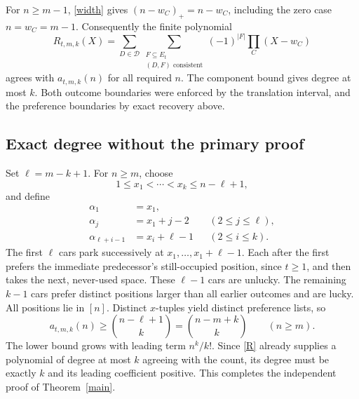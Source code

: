 \documentclass[11pt]{article}
\theoremstyle{definition}
\newcommand{\D}{\mathcal D}
\begin{document}
For $n\ge m-1$, \eqref{width} gives $(n-w_C)_+=n-w_C$, including the zero case $n=w_C=m-1$. Consequently the finite polynomial
\begin{equation}\label{R}
 R_{t,m,k}(X)=\sum_{D\in\D}
 \sum_{\substack{F\subseteq E_t\\(D,F)\text{ consistent}}}
 (-1)^{|F|}\prod_C(X-w_C)
\end{equation}
agrees with $a_{t,m,k}(n)$ for all required $n$. The component bound gives degree at most $k$. Both outcome boundaries were enforced by the translation interval, and the preference boundaries by exact recovery above.

\subsection{Exact degree without the primary proof}
Set $\ell=m-k+1$. For $n\ge m$, choose
\[
 1\le x_1<\cdots<x_k\le n-\ell+1,
\]
and define
\begin{align*}
 \alpha_1&=x_1,\\
 \alpha_j&=x_1+j-2 &&(2\le j\le\ell),\\
 \alpha_{\ell+i-1}&=x_i+\ell-1 &&(2\le i\le k).
\end{align*}
The first $\ell$ cars park successively at $x_1,\ldots,x_1+\ell-1$. Each after the first prefers the immediate predecessor's still-occupied position, since $t\ge1$, and then takes the next, never-used space. These $\ell-1$ cars are unlucky. The remaining $k-1$ cars prefer distinct positions larger than all earlier outcomes and are lucky. All positions lie in $[n]$. Distinct $x$-tuples yield distinct preference lists, so
\[
 a_{t,m,k}(n)\ge\binom{n-\ell+1}{k}
   =\binom{n-m+k}{k}\qquad(n\ge m).
\]
The lower bound grows with leading term $n^k/k!$. Since \eqref{R} already supplies a polynomial of degree at most $k$ agreeing with the count, its degree must be exactly $k$ and its leading coefficient positive. This completes the independent proof of Theorem~\ref{main}.
\end{document}

